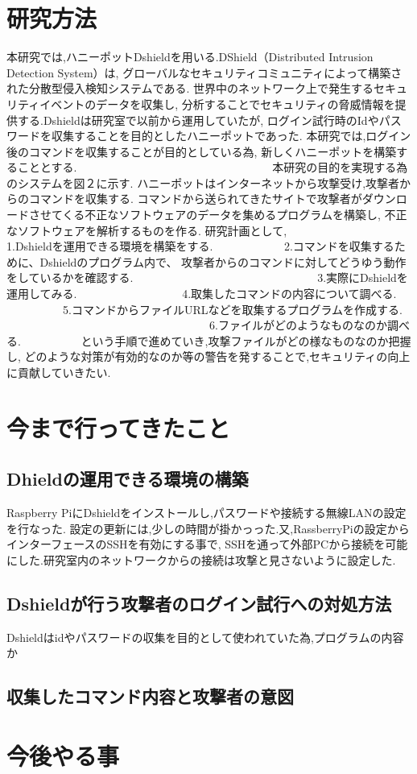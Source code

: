 \documentclass{entry}
\begin{document}
\section{研究方法}
本研究では,ハニーポットDshieldを用いる.DShield（Distributed Intrusion Detection System）は,
グローバルなセキュリティコミュニティによって構築された分散型侵入検知システムである.
世界中のネットワーク上で発生するセキュリティイベントのデータを収集し,
分析することでセキュリティの脅威情報を提供する.Dshieldは研究室で以前から運用していたが,
ログイン試行時のIdやパスワードを収集することを目的としたハニーポットであった.
本研究では,ログイン後のコマンドを収集することが目的としている為,
新しくハニーポットを構築することとする.　　　　　　　　　　　　　　　　　
本研究の目的を実現する為のシステムを図２に示す.
ハニーポットはインターネットから攻撃受け,攻撃者からのコマンドを収集する.
コマンドから送られてきたサイトで攻撃者がダウンロードさせてくる不正なソフトウェアのデータを集めるプログラムを構築し,
不正なソフトウェアを解析するものを作る.
研究計画として,　　　　　　　　　　　　　　　　1.Dshieldを運用できる環境を構築をする.
　　　　　　2.コマンドを収集するために、Dshieldのプログラム内で、
攻撃者からのコマンドに対してどうゆう動作をしているかを確認する.
　　　　　　　　　　　　　　　　3.実際にDshieldを運用してみる.
　　　　　　　　　4.取集したコマンドの内容について調べる.
　　　　　5.コマンドからファイルURLなどを取集するプログラムを作成する.
　　　　　　　　　　　　　　　　　　6.ファイルがどのようなものなのか調べる.
　　　　　という手順で進めていき,攻撃ファイルがどの様なものなのか把握し,
どのような対策が有効的なのか等の警告を発することで,セキュリティの向上に貢献していきたい.


\section{今まで行ってきたこと}
\subsection{Dhieldの運用できる環境の構築}
Raspberry PiにDshieldをインストールし,パスワードや接続する無線LANの設定を行なった.
設定の更新には,少しの時間が掛かっった.又,RassberryPiの設定からインターフェースのSSHを有効にする事で,
SSHを通って外部PCから接続を可能にした.研究室内のネットワークからの接続は攻撃と見さないように設定した.
\subsection{Dshieldが行う攻撃者のログイン試行への対処方法}
Dshieldはidやパスワードの収集を目的として使われていた為,プログラムの内容か
\subsection{収集したコマンド内容と攻撃者の意図}


\section{今後やる事}




%

\end{document}
